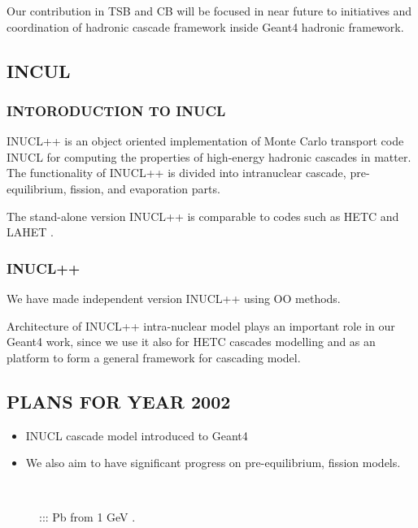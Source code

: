 \begin{appendix}
Our contribution in TSB and CB will be focused in near future to initiatives and coordination of  hadronic cascade framework inside Geant4 hadronic framework.

\subsection{INCUL}

\subsubsection{INTORODUCTION TO INUCL}
INUCL++ is an object oriented implementation of Monte Carlo transport code INUCL  for computing the properties of high-energy hadronic cascades in matter. 
The functionality of INUCL++ is divided into intranuclear cascade, pre-equilibrium, fission, and evaporation parts. 

The stand-alone version INUCL++ is comparable to codes such as HETC and LAHET \cite{titarenko99}. 

\subsubsection{INUCL++}
We have made independent version  INUCL++ using OO methods.
 
Architecture of INUCL++ intra-nuclear model plays an important role in our Geant4 work, since we use it also for HETC cascades modelling and as an platform to form a general framework for cascading model.

\subsection{PLANS FOR YEAR 2002}

\begin{itemize}
\item INUCL cascade model introduced to Geant4

\item We also aim  to have significant progress on pre-equilibrium, fission models.
\end{itemize}

\begin{figure}
  \begin{center}
    \leavevmode
    \mbox{\epsfxsize=8cm   }
       \caption{::: Pb from 1 GeV .}
  \label{massPb}
  \end{center}
\end{figure}


\end{appendix}

